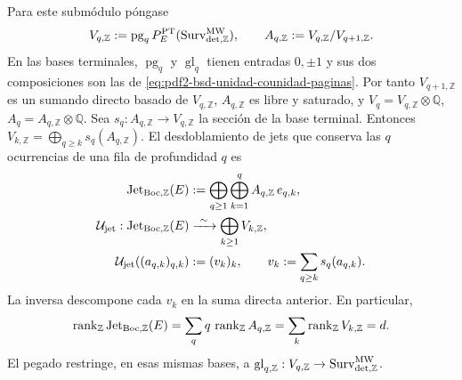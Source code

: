 Para este submódulo póngase
\begin{equation}\label{eq:pdf2-bsd-redes-paginas-saturadas}
 V_{q,\mathbb Z}:=\operatorname{pg}_qP_E^{\rm PT}
   (\operatorname{Surv}_{{\rm det},\mathbb Z}^{\rm MW}),
 \qquad
 A_{q,\mathbb Z}:=V_{q,\mathbb Z}/V_{q+1,\mathbb Z}.
\end{equation}
En las bases terminales, $\operatorname{pg}_q$ y
$\operatorname{gl}_q$ tienen entradas $0,\pm1$ y sus dos composiciones son
las de \eqref{eq:pdf2-bsd-unidad-counidad-paginas}. Por tanto
$V_{q+1,\mathbb Z}$ es un sumando directo basado de $V_{q,\mathbb Z}$,
$A_{q,\mathbb Z}$ es libre y saturado, y
$V_q=V_{q,\mathbb Z}\otimes\mathbb Q$,
$A_q=A_{q,\mathbb Z}\otimes\mathbb Q$.
Sea $s_q:A_{q,\mathbb Z}\to V_{q,\mathbb Z}$ la sección de la base
terminal. Entonces
$V_{k,\mathbb Z}=\bigoplus_{q\geq k}s_q(A_{q,\mathbb Z})$. El desdoblamiento
de jets que conserva las $q$ ocurrencias de una fila de profundidad $q$ es
\begin{equation}\label{eq:pdf2-bsd-desdoblamiento-jets}
 \begin{aligned}
 \operatorname{Jet}_{\rm Boc,\mathbb Z}(E)
   &:=\bigoplus_{q\geq1}\bigoplus_{k=1}^{q}
       A_{q,\mathbb Z}\,e_{q,k},\\
 \mathcal U_{\rm jet}:
 \operatorname{Jet}_{\rm Boc,\mathbb Z}(E)
   &\xrightarrow{\ \sim\ }
     \bigoplus_{k\geq1}V_{k,\mathbb Z},\\
 \mathcal U_{\rm jet}((a_{q,k})_{q,k})
   &:=(v_k)_k,
   \qquad v_k:=\sum_{q\geq k}s_q(a_{q,k}).
 \end{aligned}
\end{equation}
La inversa descompone cada $v_k$ en la suma directa anterior. En particular,
\begin{equation}\label{eq:pdf2-bsd-dimension-jet}
 \operatorname{rank}_{\mathbb Z}\operatorname{Jet}_{\rm Boc,\mathbb Z}(E)
 =\sum_q q\,\operatorname{rank}_{\mathbb Z}A_{q,\mathbb Z}
 =\sum_k\operatorname{rank}_{\mathbb Z}V_{k,\mathbb Z}=d.
\end{equation}
El pegado restringe, en esas mismas bases, a
$\operatorname{gl}_{q,\mathbb Z}:V_{q,\mathbb Z}\to
\operatorname{Surv}_{{\rm det},\mathbb Z}^{\rm MW}$.

